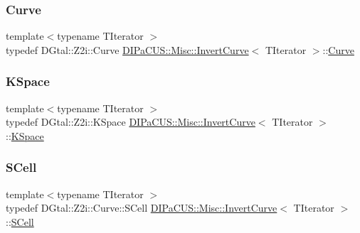 \subsubsection{\texorpdfstring{Curve}{Curve}}
{\footnotesize\ttfamily template$<$typename T\+Iterator $>$ \\
typedef D\+Gtal\+::\+Z2i\+::\+Curve \mbox{\hyperlink{structDIPaCUS_1_1Misc_1_1InvertCurve}{D\+I\+Pa\+C\+U\+S\+::\+Misc\+::\+Invert\+Curve}}$<$ T\+Iterator $>$\+::\mbox{\hyperlink{structDIPaCUS_1_1Misc_1_1InvertCurve_a4a338524a4f9be41169d6eeb519c6a20}{Curve}}}

\mbox{\label{structDIPaCUS_1_1Misc_1_1InvertCurve_a64773d7b4da91e66b4cc83112d4aa1d1}} 
\subsubsection{\texorpdfstring{K\+Space}{KSpace}}
{\footnotesize\ttfamily template$<$typename T\+Iterator $>$ \\
typedef D\+Gtal\+::\+Z2i\+::\+K\+Space \mbox{\hyperlink{structDIPaCUS_1_1Misc_1_1InvertCurve}{D\+I\+Pa\+C\+U\+S\+::\+Misc\+::\+Invert\+Curve}}$<$ T\+Iterator $>$\+::\mbox{\hyperlink{structDIPaCUS_1_1Misc_1_1InvertCurve_a64773d7b4da91e66b4cc83112d4aa1d1}{K\+Space}}}

\mbox{\label{structDIPaCUS_1_1Misc_1_1InvertCurve_a57f4545d1903fd3953018413c6fd61aa}} 
\subsubsection{\texorpdfstring{S\+Cell}{SCell}}
{\footnotesize\ttfamily template$<$typename T\+Iterator $>$ \\
typedef D\+Gtal\+::\+Z2i\+::\+Curve\+::\+S\+Cell \mbox{\hyperlink{structDIPaCUS_1_1Misc_1_1InvertCurve}{D\+I\+Pa\+C\+U\+S\+::\+Misc\+::\+Invert\+Curve}}$<$ T\+Iterator $>$\+::\mbox{\hyperlink{structDIPaCUS_1_1Misc_1_1InvertCurve_a57f4545d1903fd3953018413c6fd61aa}{S\+Cell}}}



